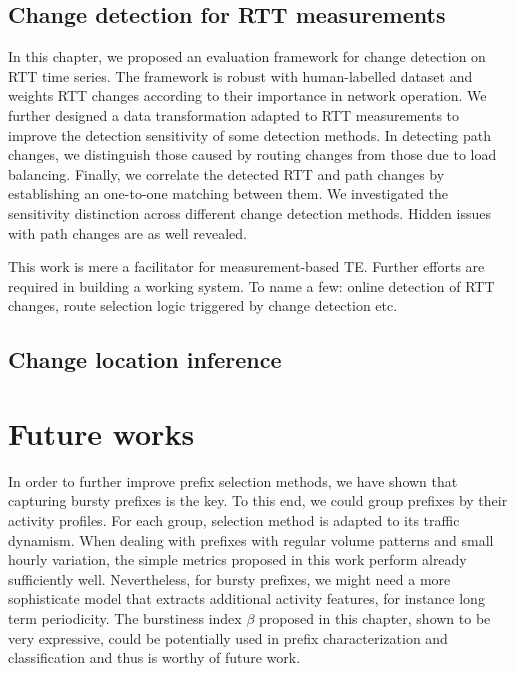 \section{Change detection for RTT measurements}

In this chapter, we proposed an evaluation framework for change detection on RTT time series.
The framework is robust with human-labelled dataset and weights RTT changes according to their importance in network operation. We further designed a data transformation adapted to RTT measurements to improve the detection sensitivity of some detection methods.
In detecting path changes, we distinguish those caused by routing changes from those due to load balancing.
Finally, we correlate the detected RTT and path changes by establishing an one-to-one matching between them. 
We investigated the sensitivity distinction across different change detection methods. 
Hidden issues with path changes are as well revealed.

This work is mere a facilitator for measurement-based TE. Further efforts are required in building a working system. To name a few: online detection of RTT changes, route selection logic triggered by change detection  etc.

\section{Change location inference}

\chapter{Future works}
In order to further improve prefix selection methods, we have shown that capturing bursty prefixes is the key. 
To this end, we could group prefixes by their activity profiles. 
For each group, selection method is adapted to its traffic dynamism.
When dealing with prefixes with regular volume patterns and small hourly variation, the simple metrics proposed in this work perform already sufficiently well. 
Nevertheless, for bursty prefixes, we might need a more sophisticate model that extracts additional activity features, for instance long term periodicity.
The burstiness index $\beta$ proposed in this chapter, shown to be very expressive, could be potentially used in prefix characterization and classification and thus is worthy of future work.
